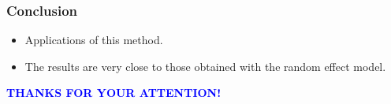 \documentclass[compress]{beamer}
\begin{document}
\begin{frame}
\frametitle{Conclusion}
\begin{itemize}
\item Applications of this method.
\item The results are very close to those obtained with the random effect model.
\end{itemize}
\end{frame}
\begin{frame}
\begin{center}
\textcolor{blue}{\bf THANKS FOR YOUR ATTENTION!}
\end{center}
\end{frame}
\end{document}

